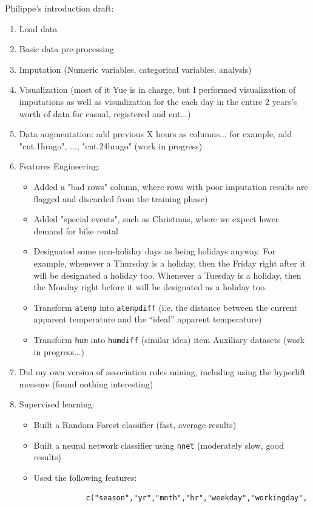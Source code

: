 \documentclass[12pt]{article}
\begin{document}
	Philippe's introduction draft:
	\begin{enumerate}
		\item Load data
			\item Basic data pre-processing
		\item Imputation (Numeric variables, categorical variables, analysis)
		\item Visualization (most of it Yue is in charge, but I performed visualization of imputations as well as visualization for the each day in the entire 2 years's worth of data for casual, registered and cnt...)
		\item Data augmentation: add previous X hours as columns... for example, add "cnt.1hrago", ..., "cnt.24hrago" (work in progress)
		\item Features Engineering:
		\begin{itemize}
			\item Added a "bad rows" column, where rows with poor imputation results are flagged and discarded from the training phase)
			\item Added "special events", such as Christmas, where we expect lower demand for bike rental
			\item Designated some non-holiday days as being holidays anyway. For example, whenever a Thursday is a holiday, then the Friday right after it will be designated a holiday too. Whenever a Tuesday is a holiday, then the Monday right before it will be designated as a holiday too.
			\item Transform \texttt{atemp} into \texttt{atempdiff} (i.e. the distance between the current apparent temperature and the ``ideal'' apparent temperature)
			\item Transform \texttt{hum} into \texttt{humdiff} (similar idea)
			item Auxiliary datasets (work in progress...)
		\end{itemize}
		\item Did my own version of association rules mining, including using the hyperlift measure (found nothing interesting)
		\item Supervised learning:
		\begin{itemize}
			\item Built a Random Forest classifier (fast, average results)
			\item Built a neural network classifier using \texttt{nnet} (moderately slow, good results)
			\item Used the following features:
			\begin{verbatim}
			c("season","yr","mnth","hr","weekday","workingday",

\end{verbatim}
\end{itemize}
\end{enumerate}
\end{document}
